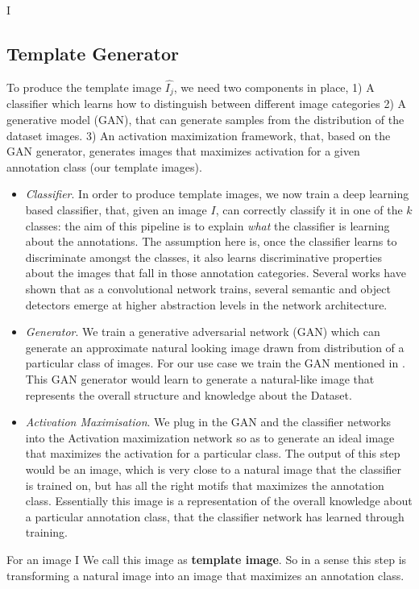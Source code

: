 
I
\subsection{Template Generator}
\par 
To produce the template image $\hat{I_j}$, we need two components in place, 1) A classifier which learns how to distinguish between different image categories  2)  A generative model (GAN), that can generate samples from the distribution of the dataset images. 3) An activation maximization framework, that, based on the GAN generator, generates images that maximizes activation for a given annotation class \cite{dosovitskiy2016inverting} (our template images). %
\begin{itemize}
	\item{\textit{Classifier}}. In order to produce template images, we now
train a deep learning based classifier, that, given an image $I$, can correctly classify it in one of the $k$ classes: the aim of this pipeline is to explain \textit{what} the classifier is learning about the annotations. The assumption here is, once the classifier learns to discriminate amongst the classes, it also learns discriminative properties about the images that fall in those annotation categories. Several works have shown that as a convolutional network trains, several semantic and object detectors emerge at higher abstraction levels in the network architecture. 
	\item \textit{Generator}. We train a generative adversarial network (GAN) which can generate an approximate natural looking image drawn from distribution of a particular class of images. For our use case we train the GAN mentioned in \cite{dosovitskiy2016inverting}. This GAN generator would learn to generate a natural-like image that represents the overall structure and knowledge about the Dataset.
	\item \textit{Activation Maximisation}. We plug in the GAN and the classifier networks into the Activation maximization network so as to generate an ideal image that maximizes the activation for a particular class. The output of this step would be an image, which is very close to a natural image that the classifier is trained on, but has all the right motifs that maximizes the annotation class.  Essentially this image is a representation of the overall knowledge about a particular annotation class, that the classifier network has learned through training. 
\end{itemize}	
For an image I We call this image as \textbf{template image}. So in a sense this step is transforming a natural image into an image that maximizes an annotation class.

